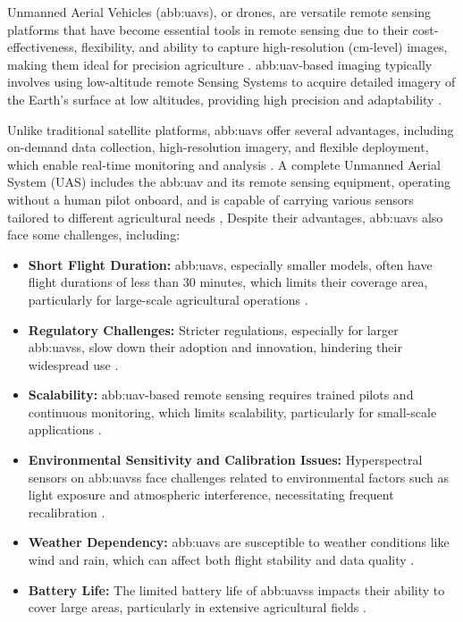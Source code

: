 Unmanned Aerial Vehicles (\gls{abb:uav}s), or drones, are versatile remote sensing platforms that have become essential tools in remote sensing due to their cost-effectiveness, flexibility, and ability to capture high-resolution (cm-level) images, making them ideal for precision agriculture \parencite{sishodia2020applications}. \gls{abb:uav}-based imaging typically involves using low-altitude remote Sensing Systems to acquire detailed imagery of the Earth’s surface at low altitudes, providing high precision and adaptability \parencite{phang2023satellite}.

Unlike traditional satellite platforms, \gls{abb:uav}s offer several advantages, including on-demand data collection, high-resolution imagery, and flexible deployment, which enable real-time monitoring and analysis \parencite{phang2023satellite}. A complete Unmanned Aerial System (UAS) includes the \gls{abb:uav} and its remote sensing equipment, operating without a human pilot onboard, and is capable of carrying various sensors tailored to different agricultural needs \parencite{adao2017hyperspectral}, Despite their advantages, \gls{abb:uav}s also face some challenges, including:

\begin{itemize}
    \item \textbf{Short Flight Duration:} \gls{abb:uav}s, especially smaller models, often have flight durations of less than 30 minutes, which limits their coverage area, particularly for large-scale agricultural operations \parencite{phang2023from}.
    
    \item \textbf{Regulatory Challenges:} Stricter regulations, especially for larger \gls{abb:uav}ss, slow down their adoption and innovation, hindering their widespread use \parencite{phang2023from, delavarpour2021technical}.
    
    \item \textbf{Scalability:} \gls{abb:uav}-based remote sensing requires trained pilots and continuous monitoring, which limits scalability, particularly for small-scale applications \parencite{phang2023from}.
    
    \item \textbf{Environmental Sensitivity and Calibration Issues:} Hyperspectral sensors on \gls{abb:uav}ss face challenges related to environmental factors such as light exposure and atmospheric interference, necessitating frequent recalibration \parencite{adao2017hyperspectral}.
    
    \item \textbf{Weather Dependency:} \gls{abb:uav}s are susceptible to weather conditions like wind and rain, which can affect both flight stability and data quality \parencite{delavarpour2021technical}.
    
    \item \textbf{Battery Life:} The limited battery life of \gls{abb:uav}ss impacts their ability to cover large areas, particularly in extensive agricultural fields \parencite{delavarpour2021technical}.
  \end{itemize}
  
